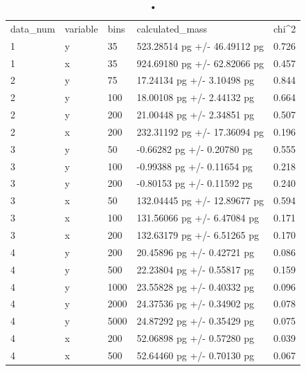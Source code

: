 \documentclass[12pt]{article}
\begin{document}
\begin{longtable}{lllll}
\caption{•}
\label{tab:calc_data}\\
data\_num & variable & bins & calculated\_mass             & chi\textasciicircum{}2 \\
1         & y        & 35   & 523.28514 pg +/- 46.49112 pg & 0.726                  \\
1         & x        & 35   & 924.69180 pg +/- 62.82066 pg & 0.457                  \\
2         & y        & 75   & 17.24134 pg +/- 3.10498 pg   & 0.844                  \\
2         & y        & 100  & 18.00108 pg +/- 2.44132 pg   & 0.664                  \\
2         & y        & 200  & 21.00448 pg +/- 2.34851 pg   & 0.507                  \\
2         & x        & 200  & 232.31192 pg +/- 17.36094 pg & 0.196                  \\
3         & y        & 50   & -0.66282 pg +/- 0.20780 pg   & 0.555                  \\
3         & y        & 100  & -0.99388 pg +/- 0.11654 pg   & 0.218                  \\
3         & y        & 200  & -0.80153 pg +/- 0.11592 pg   & 0.240                  \\
3         & x        & 50   & 132.04445 pg +/- 12.89677 pg & 0.594                  \\
3         & x        & 100  & 131.56066 pg +/- 6.47084 pg  & 0.171                  \\
3         & x        & 200  & 132.63179 pg +/- 6.51265 pg  & 0.170                  \\
4         & y        & 200  & 20.45896 pg +/- 0.42721 pg   & 0.086                  \\
4         & y        & 500  & 22.23804 pg +/- 0.55817 pg   & 0.159                  \\
4         & y        & 1000 & 23.55828 pg +/- 0.40332 pg   & 0.096                  \\
4         & y        & 2000 & 24.37536 pg +/- 0.34902 pg   & 0.078                  \\
4         & y        & 5000 & 24.87292 pg +/- 0.35429 pg   & 0.075                  \\
4         & x        & 200  & 52.06898 pg +/- 0.57280 pg   & 0.039                  \\
4         & x        & 500  & 52.64460 pg +/- 0.70130 pg   & 0.067                  \\

\end{longtable}
\end{document}
